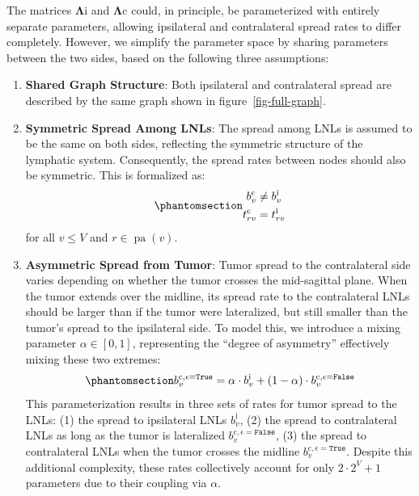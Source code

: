 \documentclass[
  sn-mathphys-num,
]{sn-jnl}
\providecommand{\tightlist}{%
  \setlength{\itemsep}{0pt}\setlength{\parskip}{0pt}}\usepackage{longtable,booktabs,array}
\begin{document}
The matrices \(\boldsymbol{\Lambda}\text{i}\) and
\(\boldsymbol{\Lambda}\text{c}\) could, in principle, be parameterized
with entirely separate parameters, allowing ipsilateral and
contralateral spread rates to differ completely. However, we simplify
the parameter space by sharing parameters between the two sides, based
on the following three assumptions:

\begin{enumerate}
\def\labelenumi{\arabic{enumi}.}
\tightlist
\item
  \textbf{Shared Graph Structure}: Both ipsilateral and contralateral
  spread are described by the same graph shown in
  figure~\ref{fig-full-graph}.
\item
  \textbf{Symmetric Spread Among LNLs}: The spread among LNLs is assumed
  to be the same on both sides, reflecting the symmetric structure of
  the lymphatic system. Consequently, the spread rates between nodes
  should also be symmetric. This is formalized as:\\
  \begin{equation}\phantomsection\label{eq-symmetries}{
    \begin{aligned}
    b_v^\text{c} &\neq b_v^\text{i} \\
    t_{rv}^\text{c} &= t_{rv}^\text{i}
    \end{aligned}
    }\end{equation} for all \(v \leq V\) and
  \(r \in \operatorname{pa}(v)\).
\item
  \textbf{Asymmetric Spread from Tumor}: Tumor spread to the
  contralateral side varies depending on whether the tumor crosses the
  mid-sagittal plane. When the tumor extends over the midline, its
  spread rate to the contralateral LNLs should be larger than if the
  tumor were lateralized, but still smaller than the tumor's spread to
  the ipsilateral side. To model this, we introduce a mixing parameter
  \(\alpha \in [0,1]\), representing the ``degree of asymmetry''
  effectively mixing these two extremes:\\
  \begin{equation}\phantomsection\label{eq-mixing}{
    b_v^{\text{c},\epsilon=\texttt{True}} = \alpha \cdot b_v^\text{i} + (1 - \alpha) \cdot b_v^{\text{c},\epsilon=\texttt{False}}
    }\end{equation} This parameterization results in three sets of rates
  for tumor spread to the LNLs: (1) the spread to ipsilateral LNLs
  \(b^\text{i}_v\), (2) the spread to contralateral LNLs as long as the
  tumor is lateralized \(b_v^{\text{c},\epsilon=\texttt{False}}\), (3)
  the spread to contralateral LNLs when the tumor crosses the midline
  \(b_v^{\text{c},\epsilon=\texttt{True}}\). Despite this additional
  complexity, these rates collectively account for only
  \(2 \cdot 2^V + 1\) parameters due to their coupling via \(\alpha\).
\end{enumerate}
\end{document}
